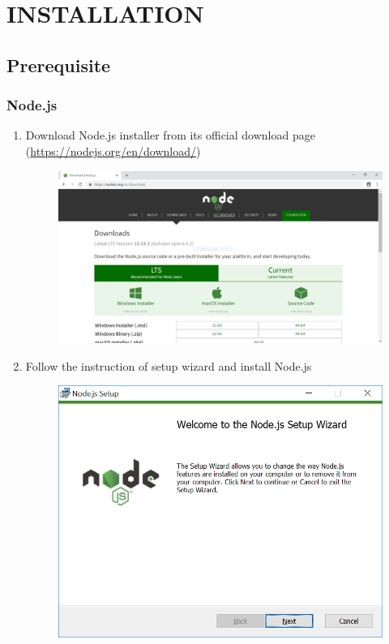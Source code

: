 \chapter{INSTALLATION}
\section{Prerequisite}
\tocless\subsection{Node.js}
\begin{enumerate}
	\item Download Node.js installer from its official download page (\href{https://nodejs.org/en/download/}{https://nodejs.org/en/download/})
	      \begin{center}
	      	\begin{figure}[H]
	      		\centering
	      		\includegraphics[width=0.6\columnwidth]{images/appendixA/Nodejs-download-page.PNG}
	      	\end{figure}
	      \end{center}
			\vspace{-1cm}
	\item Follow the instruction of setup wizard and install Node.js
	      \begin{center}
	      	\begin{figure}[H]
	      		\centering
	      		\includegraphics[width=0.6\columnwidth]{images/appendixA/Nodejs-setup.PNG}

\end{figure}
\end{center}
\end{enumerate}
